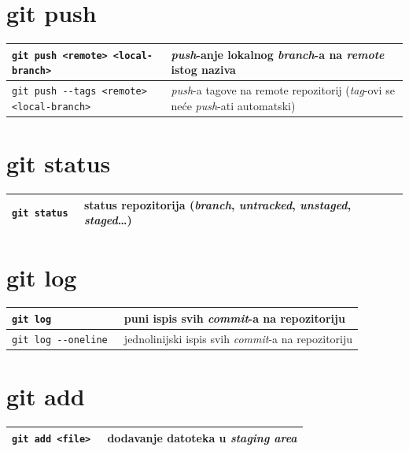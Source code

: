 \documentclass[10pt]{article}
\begin{document}
    \section*{\color{BrickRed} git push}
    \begin{tabular}{|>{\tt}p{9.00cm}|>{}p{15.50cm}|}
        \hline
        git push <remote> <local-branch>                    & \textit{push}-anje lokalnog \textit{branch}-a na \textit{remote} istog naziva \\ \hline
        git push -{}-tags <remote> <local-branch>           & \textit{push}-a tagove na remote repozitorij (\textit{tag}-ovi se neće \textit{push}-ati automatski) \\ \hline                   
    \end{tabular}

    \section*{\color{BrickRed} git status}
    \begin{tabular}{|>{\tt}p{9.00cm}|>{}p{15.50cm}|}
        \hline
        git status                                          & status repozitorija (\textit{branch}, \textit{untracked}, \textit{unstaged}, \textit{staged}\dots) \\ \hline
    \end{tabular}

    \section*{\color{BrickRed} git log}
    \begin{tabular}{|>{\tt}p{9.00cm}|>{}p{15.50cm}|}
        \hline
        git log                                             & puni ispis svih \textit{commit}-a na repozitoriju \\ \hline 
        git log -{}-oneline                                 & jednolinijski ispis svih \textit{commit}-a na repozitoriju \\ \hline
    \end{tabular}

    \section*{\color{BrickRed} git add}
    \begin{tabular}{|>{\tt}p{9.00cm}|>{}p{15.50cm}|}
        \hline
        git add <file>                                      & dodavanje datoteka u \textit{staging area} \\ \hline
    \end{tabular}
\end{document}
